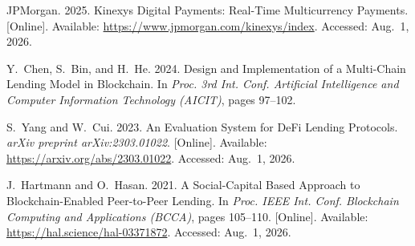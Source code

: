 {\begin{enumerate}[label={[\arabic*]}]
\item JPMorgan. 2025. Kinexys Digital Payments: Real-Time Multicurrency Payments. [Online]. Available: \url{https://www.jpmorgan.com/kinexys/index}. Accessed: Aug.~1, 2026.





\item Y.~Chen, S.~Bin, and H.~He. 2024. Design and Implementation of a Multi-Chain Lending Model in Blockchain. In \emph{Proc. 3rd Int. Conf. Artificial Intelligence and Computer Information Technology (AICIT)}, pages 97--102.

\item S.~Yang and W.~Cui. 2023. An Evaluation System for DeFi Lending Protocols. \emph{arXiv preprint arXiv:2303.01022}. [Online]. Available: \url{https://arxiv.org/abs/2303.01022}. Accessed: Aug.~1, 2026.

\item J.~Hartmann and O.~Hasan. 2021. A Social-Capital Based Approach to Blockchain-Enabled Peer-to-Peer Lending. In \emph{Proc. IEEE Int. Conf. Blockchain Computing and Applications (BCCA)}, pages 105--110. [Online]. Available: \url{https://hal.science/hal-03371872}. Accessed: Aug.~1, 2026.


\end{enumerate}}
